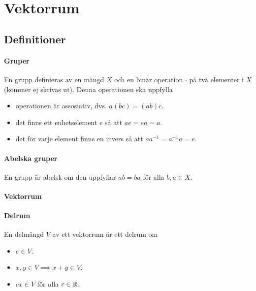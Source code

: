 \section{Vektorrum}

\subsection{Definitioner}

\paragraph{Gruper}
En grupp definieras av en mängd $X$ och en binär operation $\cdot$ på två elementer i $X$ (kommer ej skrivas ut). Denna operationen ska uppfylla
\begin{itemize}
	\item operationen är assosiativ, dvs. $a(bc) = (ab)c$.
	\item det finns ett enhetselement $e$ så att $ae = ea = a$.
	\item det för varje element finns en invers så att $aa^{-1} = a^{-1}a = e$.
\end{itemize}

\paragraph{Abelska gruper}
En grupp är abelsk om den uppfyllar $ab = ba$ för alla $b, a\in X$.

\paragraph{Vektorrum}

\paragraph{Delrum}
En delmängd $V$ av ett vektorrum är ett delrum om
\begin{itemize}
	\item $e\in V$.
	\item $x, y\in V\implies x + y\in V$.
	\item $cx\in V$ för alla $c\in\mathbb{R}$.
\end{itemize}

